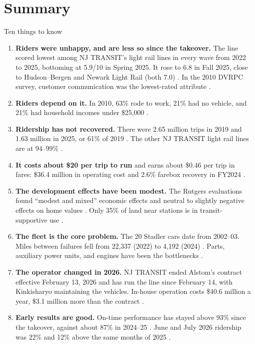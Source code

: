 \documentclass[11pt]{article}
\begin{document}
\section{Summary}
\begin{keybox}{Ten things to know}
\begin{enumerate}[leftmargin=*]
\item \textbf{Riders were unhappy, and are less so since the takeover.} The line scored lowest among NJ TRANSIT's light rail lines in every wave from 2022 to 2025, bottoming at 5.9/10 in Spring 2025. It rose to 6.8 in Fall 2025, close to Hudson--Bergen and Newark Light Rail (both 7.0) \citep{njtcss2025fall}. In the 2010 DVRPC survey, customer communication was the lowest-rated attribute \citep{dvrpc2013}.
\item \textbf{Riders depend on it.} In 2010, 63\% rode to work, 21\% had no vehicle, and 21\% had household incomes under \$25{,}000 \citep{dvrpc2013}.
\item \textbf{Ridership has not recovered.} There were 2.65 million trips in 2019 and 1.63 million in 2025, or 61\% of 2019 \citep{ntd_monthly}. The other NJ TRANSIT light rail lines are at 94--99\% \citep{njtod2026}.
\item \textbf{It costs about \$20 per trip to run} and earns about \$0.46 per trip in fares: \$36.4 million in operating cost and 2.6\% farebox recovery in FY2024 \citep{ntd_metrics2224,ols2026njt}.
\item \textbf{The development effects have been modest.} The Rutgers evaluations found ``modest and mixed'' economic effects and neutral to slightly negative effects on home values \citep{chatman2010,chatman2012}. Only 35\% of land near stations is in transit-supportive use \citep{njtod2026}.
\item \textbf{The fleet is the core problem.} The 20 Stadler cars date from 2002--03. Miles between failures fell from 22{,}337 (2022) to 4{,}192 (2024) \citep{roinj2025}. Parts, auxiliary power units, and engines have been the bottlenecks \citep{inquirer2023,njt2024interim,centraljersey2025}.
\item \textbf{The operator changed in 2026.} NJ TRANSIT ended Alstom's contract effective February 13, 2026 and has run the line since February 14, with Kinkisharyo maintaining the vehicles. In-house operation costs \$40.6 million a year, \$3.1 million more than the contract \citep{ols2027njt}.
\item \textbf{Early results are good.} On-time performance has stayed above 93\% since the takeover, against about 87\% in 2024--25 \citep{ols2027njt}. June and July 2026 ridership was 22\% and 12\% above the same months of 2025 \citep{ntd_monthly}.

\end{enumerate}
\end{keybox}
\end{document}
